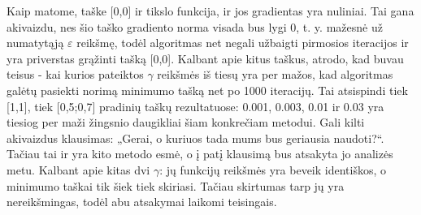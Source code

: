 \documentclass{article}
\begin{document}
Kaip matome, taške [0,0] ir tikslo funkcija, ir jos gradientas yra nuliniai. Tai gana akivaizdu, nes šio taško gradiento norma visada bus lygi 0, t. y. mažesnė už numatytąją $\varepsilon$ reikšmę, todėl algoritmas net negali užbaigti pirmosios iteracijos ir yra priverstas grąžinti tašką [0,0]. Kalbant apie kitus taškus, atrodo, kad buvau teisus - kai kurios pateiktos $\gamma$ reikšmės iš tiesų yra per mažos, kad algoritmas galėtų pasiekti norimą minimumo tašką net po 1000 iteracijų. Tai atsispindi tiek [1,1], tiek [0,5;0,7] pradinių taškų rezultatuose: 0.001, 0.003, 0.01 ir 0.03 yra tiesiog per maži žingsnio daugikliai šiam konkrečiam metodui. Gali kilti akivaizdus klausimas: „Gerai, o kuriuos tada mums bus geriausia naudoti?“. Tačiau tai ir yra kito metodo esmė, o į patį klausimą bus atsakyta jo analizės metu. Kalbant apie kitas dvi $\gamma$: jų funkcijų reikšmės yra beveik identiškos, o minimumo taškai tik šiek tiek skiriasi. Tačiau skirtumas tarp jų yra nereikšmingas, todėl abu atsakymai laikomi teisingais.
\end{document}
